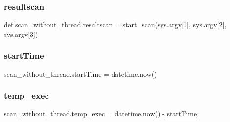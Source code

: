 \hypertarget{namespacescan__without__thread_a8caf30dc0a87aa0836fe5b0491f45cbb}{}\label{namespacescan__without__thread_a8caf30dc0a87aa0836fe5b0491f45cbb} 
\subsubsection{\texorpdfstring{resultscan}{resultscan}}
{\footnotesize\ttfamily def scan\+\_\+without\+\_\+thread.\+resultscan = \hyperlink{namespacescan__without__thread_a1085b956f7408fe1a9b3ff54fbc66984}{start\+\_\+scan}(sys.\+argv\mbox{[}1\mbox{]}, sys.\+argv\mbox{[}2\mbox{]}, sys.\+argv\mbox{[}3\mbox{]})}

\hypertarget{namespacescan__without__thread_a777417d808abe7a59485924efc125501}{}\label{namespacescan__without__thread_a777417d808abe7a59485924efc125501} 
\subsubsection{\texorpdfstring{start\+Time}{startTime}}
{\footnotesize\ttfamily scan\+\_\+without\+\_\+thread.\+start\+Time = datetime.\+now()}

\hypertarget{namespacescan__without__thread_a78dcee96ba66fb7d209f376b8455cbf9}{}\label{namespacescan__without__thread_a78dcee96ba66fb7d209f376b8455cbf9} 
\subsubsection{\texorpdfstring{temp\+\_\+exec}{temp\_exec}}
{\footnotesize\ttfamily scan\+\_\+without\+\_\+thread.\+temp\+\_\+exec = datetime.\+now() -\/ \hyperlink{namespacescan__without__thread_a777417d808abe7a59485924efc125501}{start\+Time}}

